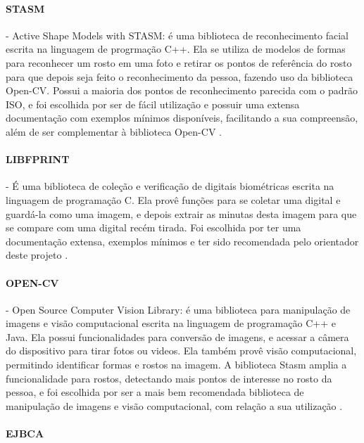 \documentclass[11pt]{article}
\begin{document}
        \paragraph{STASM}
        
        - Active Shape Models with STASM: é uma biblioteca de reconhecimento facial escrita na linguagem de progrmação C++. Ela se utiliza de modelos de formas para reconhecer um rosto em uma foto e retirar os pontos de referência do rosto para que depois seja feito o reconhecimento da pessoa, fazendo uso da biblioteca Open-CV. Possui a maioria dos pontos de reconhecimento parecida com o padrão ISO\parencite{ISO}, e foi escolhida por ser de fácil utilização e possuir uma extensa documentação com exemplos mínimos disponíveis, facilitando a sua compreensão, além de ser complementar à biblioteca Open-CV \parencite{STASM}.
		
        \paragraph{LIBFPRINT}
        
        - É uma biblioteca de coleção e verificação de digitais biomé\-tricas escrita na linguagem de programação C. Ela provê funções para se coletar uma digital e guardá-la como uma imagem, e depois extrair as minutas desta imagem para que se compare com uma digital recém tirada. Foi escolhida por ter uma documentação extensa, exemplos mínimos e ter sido recomendada pelo orientador deste projeto \parencite{PRINT}.
		
        \paragraph{OPEN-CV}
        
        - Open Source Computer Vision Library: é uma biblioteca para manipulação de imagens e visão computacional escrita na linguagem de programação C++ e Java. Ela possui funcionalidades para conversão de imagens, e acessar a câmera do dispositivo para tirar fotos ou videos. Ela também provê visão computacional, permitindo identificar formas e rostos na imagem. A biblioteca Stasm amplia a funcionalidade para rostos, detectando mais pontos de interesse no rosto da pessoa, e foi escolhida por ser a mais bem recomendada biblioteca de manipulação de imagens e visão computacional, com relação a sua utilização \parencite{OPENCV}.
		
        \paragraph{EJBCA}
        
\end{document}
